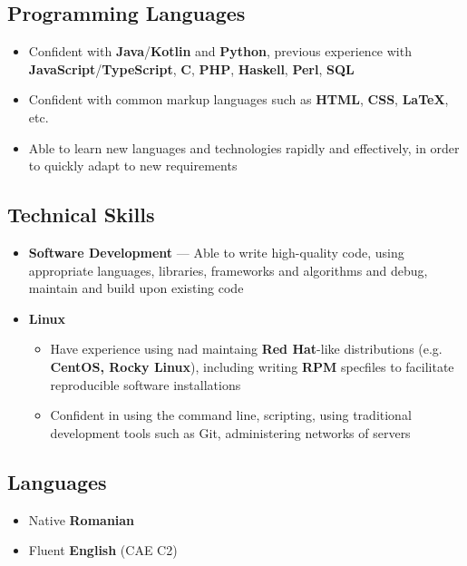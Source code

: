 \documentclass[a4paper]{article}
\begin{document}
\subsection*{Programming Languages}
\begin{itemize}
	\item Confident with \textbf{Java}/\textbf{Kotlin} and \textbf{Python}, 
	previous experience with \textbf{JavaScript}/\textbf{TypeScript}, \textbf{C},
	\textbf{PHP}, \textbf{Haskell}, \textbf{Perl}, \textbf{SQL}
	\item Confident with common markup languages such as \textbf{HTML},
	      \textbf{CSS}, \textbf{{\LaTeX}}, etc.
	\item Able to learn new languages and technologies rapidly and effectively,
	      in order to quickly adapt to new requirements
\end{itemize}

\subsection*{Technical Skills}
\begin{itemize}
	\item \textbf{Software Development} --- Able to write high-quality code, using
	      appropriate languages, libraries, frameworks and algorithms and debug,
	      maintain and build upon existing code
	\item \textbf{Linux}

	\begin{itemize}
		\item Have experience using nad maintaing \textbf{Red Hat}-like distributions (e.g. 
		\textbf{CentOS, Rocky Linux}), including writing \textbf{RPM} specfiles to facilitate 
		reproducible software installations
		\item Confident in using the command line, scripting, using traditional development 
		tools such as Git, administering networks of servers
	\end{itemize}
\end{itemize}

\subsection*{Languages}
\begin{itemize}
	\item Native \textbf{Romanian}
	\item Fluent \textbf{English} (CAE C2)
\end{itemize}
\end{document}
